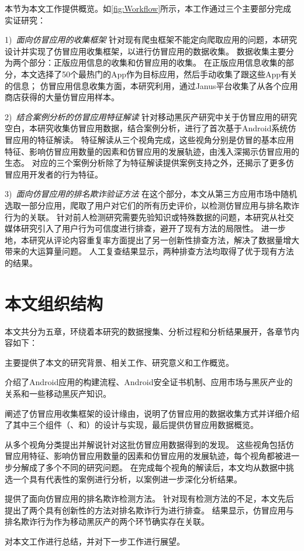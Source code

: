 本节为本文工作提供概览。如\autoref{fig:Workflow}所示，本工作通过三个主要部分完成实证研究：

1)\ \emph{面向仿冒应用的收集框架\mytool } \quad
针对现有爬虫框架不能定向爬取应用的问题，本研究设计并实现了仿冒应用收集框架\mytool，以进行仿冒应用的数据收集。
数据收集主要分为两个部分：正版应用信息的收集和仿冒应用的收集。
在正版应用信息收集的部分，本文选择了50个最热门的App作为目标应用，然后手动收集了跟这些App有关的信息；
仿冒应用信息收集方面，本研究利用\mytool，通过Janus平台收集了从各个应用商店获得的大量仿冒应用样本。

2)\ \emph{结合案例分析的仿冒应用特征解读} \quad
针对移动黑灰产研究中关于仿冒应用的研究空白，本研究收集仿冒应用数据，结合案例分析，进行了首次基于Android系统仿冒应用的特征解读。
特征解读从三个视角完成，这些视角分别是仿冒的基本应用特征、影响仿冒应用数量的因素和仿冒应用的发展轨迹，由浅入深揭示仿冒应用的生态。
对应的三个案例分析除了为特征解读提供案例支持之外，还揭示了更多仿冒应用开发者的行为特征。

3)\ \emph{面向仿冒应用的排名欺诈验证方法} \quad
在这个部分，本文从第三方应用市场中随机选取一部分应用，爬取了用户对它们的所有历史评价，以检测仿冒应用与排名欺诈行为的关联。
针对前人检测研究需要先验知识或特殊数据的问题，本研究从社交媒体研究引入了用户行为可信度进行排查，避开了现有方法的局限性。
进一步地，本研究从评论内容重复率方面提出了另一创新性排查方法，解决了数据量增大带来的大运算量问题。
人工复查结果显示，两种排查方法均取得了优于现有方法的结果。


\section{本文组织结构}
本文共分为五章，环绕着本研究的数据搜集、分析过程和分析结果展开，各章节内容如下：

 主要提供了本文的研究背景、相关工作、研究意义和工作概览。

 介绍了Android应用的构建流程、Android安全证书机制、应用市场与黑灰产业的关系和一些移动黑灰产知识。

 阐述了仿冒应用收集框架\mytool 的设计缘由，说明了仿冒应用的数据收集方式并详细介绍了其中三个组件（\componentA、\componentB 和\componentC）的设计与实现，最后提供仿冒应用数据概览。

 从多个视角分类提出并解说针对这批仿冒应用数据得到的发现。
这些视角包括仿冒应用特征、影响仿冒应用数量的因素和仿冒应用的发展轨迹，每个视角都被进一步分解成了多个不同的研究问题。
在完成每个视角的解读后，本文均从数据中挑选一个具有代表性的案例进行分析，以案例进一步深化分析结果。

 提供了面向仿冒应用的排名欺诈检测方法。
针对现有检测方法的不足，本文先后提出了两个具有创新性的方法对排名欺诈行为进行排查。
结果显示，仿冒应用与排名欺诈行为作为移动黑灰产的两个环节确实存在关联。

 对本文工作进行总结，并对下一步工作进行展望。
